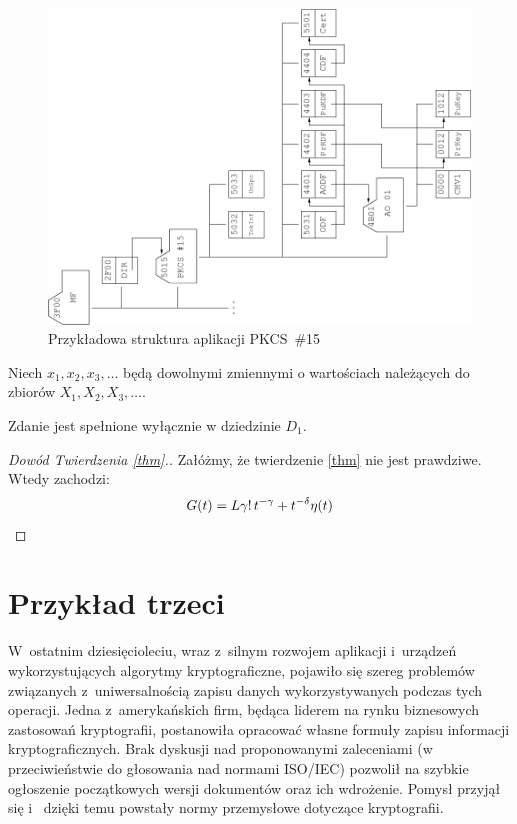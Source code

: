 \begin{figure}[htb]
    \begin{center}
	\includegraphics[angle=-90,scale=.6]{img/pkcs15fs.pdf}
	\caption{Przykładowa struktura aplikacji PKCS~\#15}
	\label{ppkcs15fs}
    \end{center}
\end{figure}

\begin{thm}
\label{thm}
Niech $x_1, x_2, x_3, \ldots$ będą dowolnymi zmiennymi o wartościach
należących do zbiorów $X_1, X_2, X_3, \ldots$.
\end{thm}

\begin{note}
Zdanie jest spełnione wyłącznie w dziedzinie $D_1$.
\end{note}

\begin{proof}[Dowód Twierdzenia \ref{thm}.]
Załóżmy, że twierdzenie \ref{thm} nie jest prawdziwe. Wtedy zachodzi:
\begin{equation}
G(t)=L\gamma!\,t^{-\gamma}+t^{-\delta}\eta(t) \qedhere
\end{equation}
\end{proof}

\section{Przykład trzeci}

W~ostatnim dziesięcioleciu, wraz z~silnym rozwojem aplikacji i~urządzeń
wykorzystujących algorytmy kryptograficzne, pojawiło się szereg problemów
związanych z~uniwersalnością zapisu danych wykorzystywanych podczas tych
operacji. Jedna z~amerykańskich firm, będąca liderem na rynku biznesowych
zastosowań kryptografii, postanowiła opracować własne formuły zapisu
informacji kryptograficznych. Brak dyskusji nad proponowanymi zaleceniami
(w przeciwieństwie do głosowania nad normami ISO/IEC) pozwolił na szybkie ogłoszenie
początkowych wersji dokumentów oraz ich wdrożenie. Pomysł przyjął się i~
dzięki temu powstały normy przemysłowe dotyczące kryptografii.

